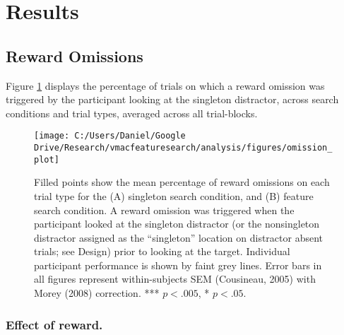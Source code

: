 \documentclass[man, a4paper, noextraspace, 11pt,floatsintext]{apa6}
\theoremstyle{definition}
\theoremstyle{definition}
\theoremstyle{definition}
\theoremstyle{remark}
\begin{document}
\section{Results}\label{results}

\subsection{Reward Omissions}\label{reward-omissions}

Figure \ref{fig:OmissionPlot} displays the percentage of trials on which
a reward omission was triggered by the participant looking at the
singleton distractor, across search conditions and trial types, averaged
across all trial-blocks.

\begin{figure}[!h]

{\centering \texttt{[image: C:/Users/Daniel/Google Drive/Research/vmacfeaturesearch/analysis/figures/omission\_plot]} 

}

\caption{Filled points show the mean percentage of reward
omissions on each trial type for the (A) singleton search condition, and
(B) feature search condition. A reward omission was triggered when the
participant looked at the singleton distractor (or the nonsingleton
distractor assigned as the \enquote{singleton} location on distractor
absent trials; see Design) prior to looking at the target. Individual
participant performance is shown by faint grey lines. Error bars in all
figures represent within-subjects SEM (Cousineau, 2005) with Morey
(2008) correction. *** \(p<.005\), * \(p<.05\).}\label{fig:OmissionPlot}
\end{figure}

\subsubsection{Effect of reward.}\label{effect-of-reward.}
\end{document}
